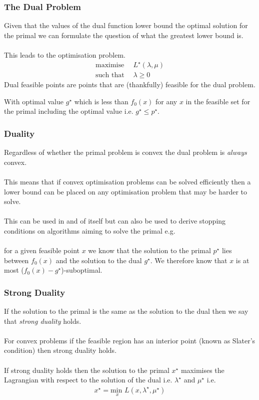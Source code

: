 \documentclass{beamer}
\begin{document}
\begin{frame}
    \frametitle{The Dual Problem}
    Given that the values of the dual function lower bound the optimal solution
    for the primal we can formulate the question of what the greatest lower
    bound is.
    \\~\\
    This leads to the optimisation problem.
    {\footnotesize
    \begin{align*}
        \text{maximise } \, &L^{\star}(\lambda, \mu)\\
        \text{such that } &\lambda \geq 0
    \end{align*}}
    Dual feasible points are points that are (thankfully) feasible for the dual
    problem.

    With optimal value $g^{\star}$ which is less than $f_{0}(x)$ for any
    $x$ in the feasible set for the primal including the optimal value i.e.
    $g^{\star} \leq p^{\star}$.
\end{frame}

\begin{frame}
    \frametitle{Duality}
    Regardless of whether the primal problem is convex the dual problem is
    \textit{always} convex.
    \\~\\
    This means that if convex optimisation problems can be solved efficiently
    then a lower bound can be placed on any optimisation problem that may be
    harder to solve.
    \\~\\
    This can be used in and of itself but can also be used to derive stopping
    conditions on algorithms aiming to solve the primal e.g.
    \\~\\
    for a given
    feasible point $x$ we know that the solution to the primal $p^{\star}$ lies
    between $f_{0}(x)$ and the solution to the dual $g^{\star}$. We therefore know that $x$
    is at most ($f_{0}(x) - g^{\star}$)-suboptimal.
\end{frame}

\begin{frame}
    \frametitle{Strong Duality}
    If the solution to the primal is the same as the solution to the dual
    then we say that \textit{strong duality} holds.
    \\~\\
    For convex problems if the feasible region has an interior point (known as
    Slater's condition) then strong duality holds.
    \\~\\
    If strong duality holds then the solution to the primal $x^{\star}$
    maximises the Lagrangian with respect to the solution of the dual i.e.
    $\lambda^{\star}$ and $\mu^{\star}$ i.e.
    \begin{align*}
        x^{\star} = \underset{x}{\text{min }} L(x, \lambda^{\star}, \mu^{\star})
    \end{align*}
\end{frame}
\end{document}
